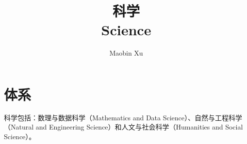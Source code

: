 \documentclass[12pt]{book}
\begin{document}
\title{科学\\Science}  %
\author{Maobin Xu} %
\maketitle  %


\tableofcontents  %
\mainmatter %

\part{体系}

科学包括：数理与数据科学（Mathematics and Data Science）、自然与工程科学（Natural and Engineering Science）和人文与社会科学（Humanities and Social Science）。
\end{document}
